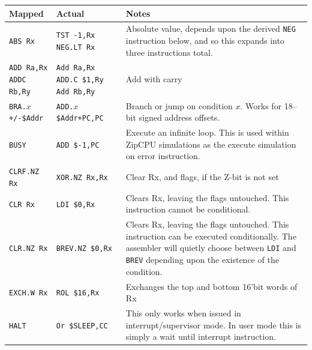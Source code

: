 \documentclass{gqtekspec}
\begin{document}
\begin{table}\begin{center}
\begin{tabular}{p{1.4in}p{1.5in}p{3in}}\\\hline
Mapped & Actual  & Notes \\\hline
{\tt ABS Rx}
	& \parbox[t]{1.5in}{\tt TST -1,Rx\\NEG.LT Rx}
	& Absolute value, depends upon the derived {\tt NEG} instruction
	below, and so this expands into three instructions total.\\\hline
\parbox[t]{1.4in}{\tt ADD Ra,Rx\\ADDC Rb,Ry}
	& \parbox[t]{1.5in}{\tt Add Ra,Rx\\ADD.C \$1,Ry\\Add Rb,Ry}
	& Add with carry \\\hline
{\tt BRA.$x$ +/-\$Addr}
	& \hbox{\tt ADD.$x$ \$Addr+PC,PC}
	& Branch or jump on condition $x$.  Works for 18--bit
		signed address offsets.\\\hline
{\tt BUSY } & {\tt ADD \$-1,PC} & Execute an infinite loop.  This is used
	within ZipCPU simulations as the execute simulation on error
	instruction. \\\hline
{\tt CLRF.NZ Rx }
	& {\tt XOR.NZ Rx,Rx}
	& Clear Rx, and flags, if the Z-bit is not set \\\hline
{\tt CLR Rx }
	& {\tt LDI \$0,Rx}
	& Clears Rx, leaving the flags untouched.  This instruction cannot be
		conditional. \\\hline
{\tt CLR.NZ Rx }
	& {\tt BREV.NZ \$0,Rx}
	& Clears Rx, leaving the flags untouched.  This instruction can be
		executed conditionally. The assembler will quietly  choose
		between {\tt LDI} and {\tt BREV} depending upon the existence
		of the condition.\\\hline
{\tt EXCH.W Rx }
	& {\tt ROL \$16,Rx}
	& Exchanges the top and bottom 16'bit words of Rx \\\hline
{\tt HALT }
	& {\tt Or \$SLEEP,CC}
	& This only works when issued in interrupt/supervisor mode.  In user
	mode this is simply a wait until interrupt instruction.


\end{tabular}
\end{center}
\end{table}
\end{document}
